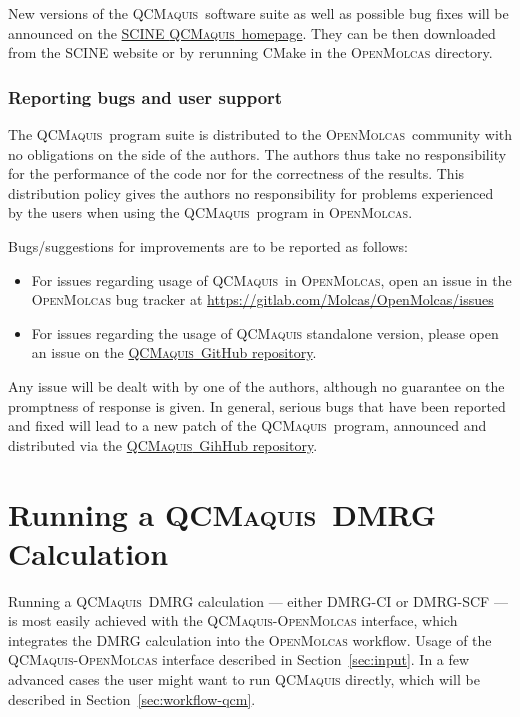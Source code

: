 \documentclass[bibliography=totoc,12pt,a4paper]{scrartcl}
\newcommand{\mol}{\textsc{OpenMolcas}}
\newcommand{\qcm}{\textsc{QCMaquis}}
\begin{document}
New versions of the \qcm\ software suite as well as possible bug fixes will be announced
on the \href{https://www.scine.ethz.ch/download/qcmaquis}{SCINE \qcm\ homepage}. They can be then downloaded from the SCINE website or by rerunning CMake in the \mol{} directory.

\subsubsection{Reporting bugs and user support}\label{sec:bugs-support}

The \qcm\ program suite is distributed to the \mol\ community with no obligations on the side of the authors.
The authors thus take no responsibility for the performance of the code nor for the correctness of the results.
This distribution policy gives the authors no responsibility for problems experienced by the users when using the \qcm\ program in \mol.

Bugs/suggestions for improvements are to be reported as follows:

\begin{itemize}
  \item For issues regarding usage of \qcm\ in \mol{}, open an issue in the \mol{} bug tracker at \url{https://gitlab.com/Molcas/OpenMolcas/issues}
  \item For issues regarding the usage of \qcm{} standalone version, please open an issue on the \href{https://github.com/qcscine/qcmaquis}{\qcm\ GitHub repository}.
\end{itemize}

Any issue will be dealt with by one of the authors, although no guarantee on the promptness of response is given.
In general, serious bugs that have been reported and fixed will lead to a new patch of the \qcm\ program, announced and distributed via the \href{https://github.com/qcscine/qcmaquis}{\qcm\ GihHub repository}.

\clearpage
\newpage

\section{Running a \qcm\ DMRG Calculation}
\label{sec:general-consid}

Running a \qcm\ DMRG calculation --- either DMRG-CI or DMRG-SCF --- is most easily achieved with the \qcm-\mol{} interface\cite{interface}, which integrates the DMRG calculation into the \mol{} workflow.
Usage of the \qcm-\mol{} interface described in Section~\ref{sec:input}.
In a few advanced cases the user might want to run \qcm{} directly, which will be described in Section~\ref{sec:workflow-qcm}.
\end{document}
